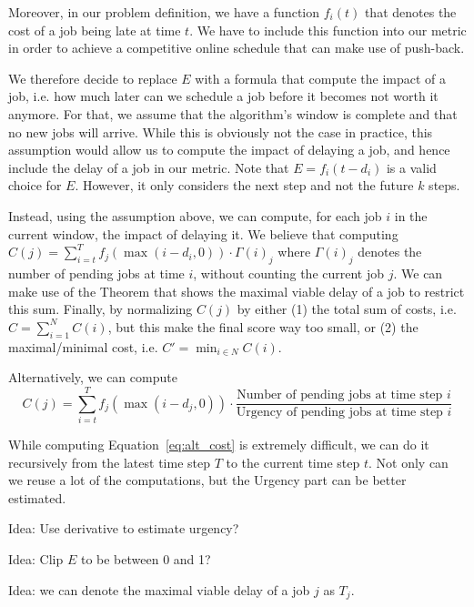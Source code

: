 Moreover, in our problem definition, we have a function $f_i (t)$ that denotes the cost of a job being late at time $t$. We have to include this function into our metric in order to achieve a competitive online schedule that can make use of push-back.

We therefore decide to replace $E$ with a formula that compute the impact of a job, i.e. how much later can we schedule a job before it becomes not worth it anymore. For that, we assume that the algorithm's window is complete and that no new jobs will arrive. While this is obviously not the case in practice, this assumption would allow us to compute the impact of delaying a job, and hence include the delay of a job in our metric.
Note that $E = f_i (t - d_i)$ is a valid choice for $E$. However, it only considers the next step and not the future $k$ steps. 

Instead, using the assumption above, we can compute, for each job $i$ in the current window, the impact of delaying it. We believe that computing $C(j) = \sum_{i = t}^T f_j (\max(i - d_i, 0)) \cdot \Gamma(i)_j$ where $\Gamma(i)_j$ denotes the number of pending jobs at time $i$, without counting the current job $j$. We can make use of the Theorem that shows the maximal viable delay of a job to restrict this sum. Finally, by normalizing $C(j)$ by either (1) the total sum of costs, i.e. $\hat{C} = \sum_{i=1}^N C(i)$, but this make the final score way too small, or (2) the maximal/minimal cost, i.e. $C' = \min_{i \in N} C(i)$.

Alternatively, we can compute 
\begin{equation}
    C(j) = \sum_{i = t}^{T} f_j (\max(i - d_j, 0)) \cdot \frac{\text{Number of pending jobs at time step } i}{\text{Urgency of pending jobs at time step } i}
    \label{eq:alt_cost}
\end{equation}

While computing Equation~\ref{eq:alt_cost} is extremely difficult, we can do it recursively from the latest time step $T$ to the current time step $t$. Not only can we reuse a lot of the computations, but the Urgency part can be better estimated.


Idea: Use derivative to estimate urgency?

Idea: Clip $E$ to be between 0 and 1?

Idea: we can denote the maximal viable delay of a job $j$ as $T_j$.

